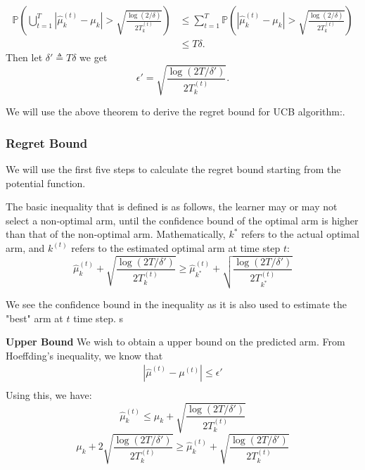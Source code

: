 \documentclass[11pt]{article}
\begin{document}
\begin{align*}
    \mathbb{P}\left( \bigcup_{t=1}^{T} |\widehat{\mu}_k^{(t)} - \mu_k| > \sqrt{\frac{\log(2/\delta)}{2T^{(t)}_k}} \right) &\leq \sum_{t=1}^T \mathbb{P}\left(  |\widehat{\mu}_k^{(t)} - \mu_k| > \sqrt{\frac{\log(2/\delta)}{2T^{(t)}_k}} \right)\\
    &\leq T\delta.
\end{align*}
Then let $\delta' \triangleq T\delta$ we get 
\begin{equation}
    \epsilon' = \sqrt{\frac{\log(2T/\delta')}{2T^{(t)}_k}}.
\label{union_heoff}
\end{equation}

We will use the above theorem to derive the regret bound for UCB algorithm:.


\subsubsection{Regret Bound}
We will use the first five steps to calculate the regret bound starting from the potential function.


The basic inequality that is defined is as follows, the learner may or may not select a non-optimal arm, until the confidence bound of the optimal arm is higher than that of the non-optimal arm. Mathematically, $k^*$ refers to the actual optimal arm, and $k^{(t)}$ refers to the estimated optimal arm at time step $t$:
$$\hat{\mu}_k^{(t)} + \sqrt{\frac{\log(2T/\delta')}{2T_{k}^{(t)}}} \ge \hat{\mu}_{k^*}^{(t)} + \sqrt{\frac{\log(2T/\delta')}{2T_{k^*}^{(t)}}}$$

We see the confidence bound in the inequality as it is also used to estimate the "best" arm at $t$ time step. s

\textbf{Upper Bound} We wish to obtain a upper bound on the predicted arm. From Hoeffding's inequality, we know that \begin{align*}
    |\hat{\mu}^{(t)} - \mu^{(t)}| \le \epsilon' \\
\end{align*}  
Using this, we have: 
$$\hat{\mu}_k^{(t)} \le \mu_k + \sqrt{\frac{\log(2T/\delta')}{2T_{k}^{(t)}}}$$
$$\mu_k + 2\sqrt{\frac{\log(2T/\delta')}{2T_{k}^{(t)}}} \ge \hat{\mu}_k^{(t)} + \sqrt{\frac{\log(2T/\delta')}{2T_{k}^{(t)}}}$$
\end{document}
